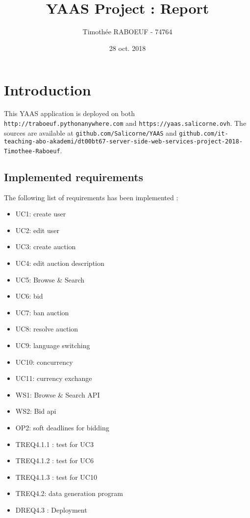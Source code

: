 \documentclass[a4paper, 11pt]{report}
\title{YAAS Project : Report}
\author{Timothée RABOEUF - 74764}
\date{28 oct. 2018}
\begin{document}
 
\maketitle
\tableofcontents
    
\chapter{Introduction}

    This YAAS application is deployed on both \texttt{http://traboeuf.pythonanywhere.com} and \texttt{https://yaas.salicorne.ovh}. The sources are available at \texttt{github.com/Salicorne/YAAS} and 
    \texttt{github.com/it-teaching-abo-akademi/dt00bt67-server-side-web-services-project-2018-Timothee-Raboeuf}. 

    \section{Implemented requirements}

    The following list of requirements has been implemented : 
    \begin{itemize}
        \item UC1: create user
        \item UC2: edit user
        \item UC3: create auction
        \item UC4: edit auction description
        \item UC5: Browse \& Search
        \item UC6: bid
        \item UC7: ban auction
        \item UC8: resolve auction
        \item UC9: language switching
        \item UC10: concurrency
        \item UC11: currency exchange
        \item WS1: Browse \& Search API
        \item WS2: Bid api
        \item OP2: soft deadlines for bidding
        \item TREQ4.1.1 : test for UC3
        \item TREQ4.1.2 : test for UC6
        \item TREQ4.1.3 : test for UC10
        \item TREQ4.2: data generation program
        \item DREQ4.3 : Deployment

    \end{itemize}
\end{document}
